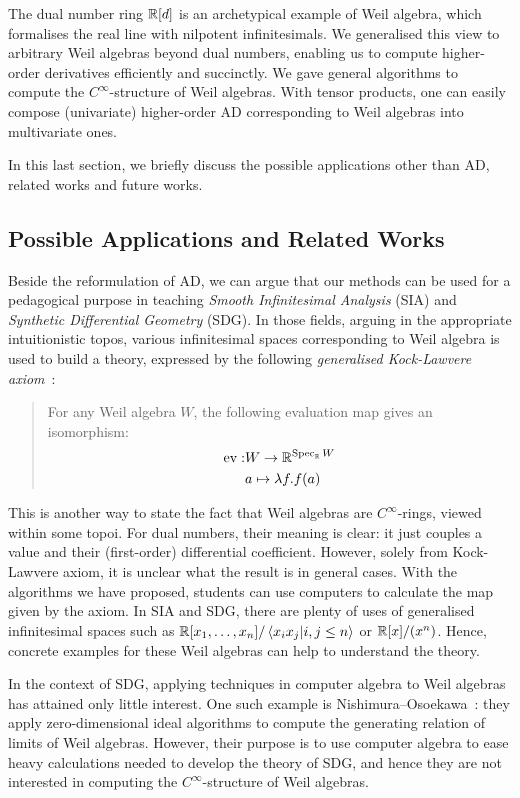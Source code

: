 The dual number ring $\mathbb{R}[d]$ is an archetypical example of Weil algebra, which formalises the real line with nilpotent infinitesimals.
We generalised this view to arbitrary Weil algebras beyond dual numbers, enabling us to compute higher-order derivatives efficiently and succinctly.
We gave general algorithms to compute the $C^\infty$-structure of Weil algebras.
With tensor products, one can easily compose (univariate) higher-order AD corresponding to Weil algebras into multivariate ones.

In this last section, we briefly discuss the possible applications other than AD, related works and future works.

\subsection{Possible Applications and Related Works}
Beside the reformulation of AD, we can argue that our methods can be used for a pedagogical purpose in teaching \emph{Smooth Infinitesimal Analysis} (SIA) and \emph{Synthetic Differential Geometry} (SDG).
In those fields, arguing in the appropriate intuitionistic topos, various infinitesimal spaces corresponding to Weil algebra is used to build a theory, expressed by the following \emph{generalised Kock-Lawvere axiom}~\cite{Moerdijk:1991aa}:

\begin{quote}
  For any Weil algebra $W$, the following evaluation map gives an isomorphism:
  \begin{align*}
    \mathop{\mathrm{ev}}: &W \to   \mathbb{R}^{\mathop{\mathrm{Spec}}_{\mathbb{R}}{W}}\\
       &a \mapsto \lambda f. f(a)
  \end{align*}
\end{quote}
This is another way to state the fact that Weil algebras are $C^\infty$-rings, viewed within some topoi.
For dual numbers, their meaning is clear: it just couples a value and their (first-order) differential coefficient.
However, solely from Kock-Lawvere axiom, it is unclear what the result is in general cases.
With the algorithms we have proposed, students can use computers to calculate the map given by the axiom.
In SIA and SDG, there are plenty of uses of generalised infinitesimal spaces such as $\mathbb{R}[x_1,\dots, x_n]/\braket{x_i x_j | i, j \leq n}$ or $\mathbb{R}[x]/(x^n)$.
Hence, concrete examples for these Weil algebras can help to understand the theory.

In the context of SDG, applying techniques in computer algebra to Weil algebras has attained only little interest.
One such example is Nishimura--Osoekawa~\cite{Nishimura:2007aa}: they apply zero-dimensional ideal algorithms to compute the generating relation of limits of Weil algebras.
However, their purpose is to use computer algebra to ease heavy calculations needed to develop the theory of SDG, and hence they are not interested in computing the $C^\infty$-structure of Weil algebras.

